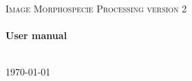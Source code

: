 \begin{titlepage}
\begin{center}
\noindent
\\[4cm]
\textsc{\Large Image Morphospecie Processing version 2}\\[1cm]
\HRule
\\[0.3cm]
\huge \bfseries User manual
\\[0.3cm]
\HRule
\\[2cm]
\noindent 

\vfill
{\large \today}
\end{center}
\end{titlepage}
